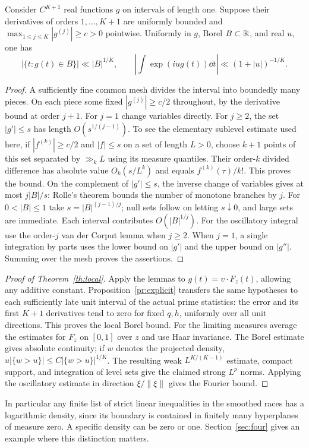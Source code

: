 \begin{lemma}\label{le:occ}
Consider \(C^{K+1}\) real functions \(g\) on intervals of length one. Suppose their derivatives of orders \(1,\ldots,K+1\) are uniformly bounded and \(\max_{1\le j\le K}|g^{(j)}|\ge c>0\) pointwise. Uniformly in \(g\), Borel \(B\subset\mathbb R\), and real \(u\), one has
\[
 |\{t:g(t)\in B\}|\ll |B|^{1/K},\qquad
 \left|\int \exp(iu g(t))\dd t\right|\ll(1+|u|)^{-1/K}.
\]
\end{lemma}
\begin{proof}
A sufficiently fine common mesh divides the interval into boundedly many pieces. On each piece some fixed \(|g^{(j)}|\ge c/2\) throughout, by the derivative bound at order \(j+1\). For \(j=1\) change variables directly. For \(j\ge2\), the set \(|g'|\le s\) has length \(O(s^{1/(j-1)})\). To see the elementary sublevel estimate used here, if \(|f^{(k)}|\ge c/2\) and \(|f|\le s\) on a set of length \(L>0\), choose \(k+1\) points of this set separated by \(\gg_k L\) using its measure quantiles. Their order-\(k\) divided difference has absolute value \(O_k(s/L^k)\) and equals \(f^{(k)}(\tau)/k!\). This proves the bound. On the complement of \(|g'|\le s\), the inverse change of variables gives at most \(j|B|/s\): Rolle's theorem bounds the number of monotone branches by \(j\). For \(0<|B|\le1\) take \(s=|B|^{(j-1)/j}\); null sets follow on letting \(s\downarrow0\), and large sets are immediate. Each interval contributes \(O(|B|^{1/j})\).
For the oscillatory integral use the order-\(j\) van der Corput lemma when \(j\ge2\). When \(j=1\), a single integration by parts uses the lower bound on \(|g'|\) and the upper bound on \(|g''|\). Summing over the mesh proves the assertions.
\end{proof}

\begin{proof}[Proof of Theorem~\ref{th:local}]
Apply the lemmas to \(g(t)=v\cdot F_z(t)\), allowing any additive constant. Proposition~\ref{pr:explicit} transfers the same hypotheses to each sufficiently late unit interval of the actual prime statistics: the error and its first \(K+1\) derivatives tend to zero for fixed \(q,h\), uniformly over all unit directions. This proves the local Borel bound. For the limiting measures average the estimates for \(F_z\) on \([0,1]\) over \(z\) and use Haar invariance. The Borel estimate gives absolute continuity; if \(w\) denotes the projected density, \(u|\{w>u\}|\le C|\{w>u\}|^{1/K}\). The resulting weak \(L^{K/(K-1)}\) estimate, compact support, and integration of level sets give the claimed strong \(L^p\) norms. Applying the oscillatory estimate in direction \(\xi/\|\xi\|\) gives the Fourier bound.
\end{proof}

In particular any finite list of strict linear inequalities in the smoothed races has a logarithmic density, since its boundary is contained in finitely many hyperplanes of measure zero. A specific density can be zero or one. Section~\ref{sec:four} gives an example where this distinction matters.
